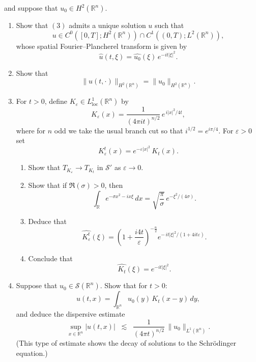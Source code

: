 \documentclass[12pt,a4paper]{article}
\theoremstyle{plain}
\theoremstyle{definition}
\theoremstyle{remark}
\theoremstyle{remark}
\begin{document}
and suppose that $u_0 \in H^2(\mathbb{R}^n)$.

\begin{enumerate}[label=\textnormal{(\alph*)}]
	
	\item Show that \((3)\) admits a unique solution $u$ such that
	\[
	u \in C^0([0,T];H^2(\mathbb{R}^n)) \cap C^1((0,T);L^2(\mathbb{R}^n)),
	\]
	whose spatial Fourier–Plancherel transform is given by
	\[
	\widehat{u}(t,\xi) = \widehat{u_0}(\xi)\, e^{-it|\xi|^2}.
	\]
	
	\item Show that
	\[
	\|u(t,\cdot)\|_{H^2(\mathbb{R}^n)} = \|u_0\|_{H^2(\mathbb{R}^n)}.
	\]
	
	\item For $t>0$, define $K_\varepsilon \in L^1_{\mathrm{loc}}(\mathbb{R}^n)$ by
	\[
	K_\varepsilon(x)
	= \frac{1}{(4\pi i t)^{n/2}} \, e^{\, i|x|^2 / 4t },
	\]
	where for $n$ odd we take the usual branch cut so that $i^{1/2}=e^{i\pi/4}$.
	For $\varepsilon>0$ set
	\[
	K_\varepsilon^t(x) = e^{-\varepsilon|x|^2}\, K_t(x).
	\]
	
	\begin{enumerate}[label=\roman*)]
		\item Show that $T_{K_\varepsilon} \to T_{K_t}$ in $\mathscr{S}'$ as $\varepsilon\to0$.
		
		\item Show that if $\Re(\sigma)>0$, then
		\[
		\int_{\mathbb{R}} e^{-\sigma x^2 - i x \xi}\, dx
		= \sqrt{\frac{\pi}{\sigma}}\, e^{-\xi^2/(4\sigma)}.
		\]
		
		\item Deduce that
		\[
		\widehat{K_\varepsilon^t}(\xi)
		= \left(1+\frac{i4t}{\varepsilon}\right)^{-\tfrac{n}{2}}
		e^{-\, i t|\xi|^2/(1+4it\varepsilon)}.
		\]
		
		\item Conclude that 
		\[
		\widehat{K_t}(\xi) = e^{-it|\xi|^2}.
		\]
		
	\end{enumerate}
	
	\item Suppose that $u_0 \in \mathscr{S}(\mathbb{R}^n)$.  
	Show that for $t>0$:
	\[
	u(t,x) = \int_{\mathbb{R}^n} u_0(y)\, K_t(x-y)\, dy,
	\]
	and deduce the dispersive estimate
	\[
	\sup_{x\in\mathbb{R}^n} |u(t,x)|
	\;\;\lesssim\;\;
	\frac{1}{(4\pi t)^{n/2}}\, \|u_0\|_{L^1(\mathbb{R}^n)}.
	\]
	(This type of estimate shows the decay of solutions to the Schrödinger equation.)
	
\end{enumerate}
\end{document}
